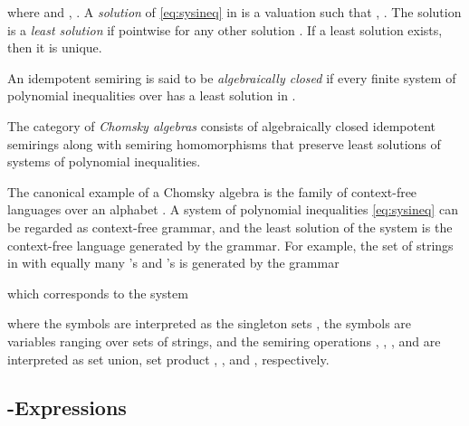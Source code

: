 \documentclass[copyright,creativecommons]{eptcs}
\theoremstyle{remark}
\newcommand{\fhcomment}[1]{\textcolor{red}{[\textbf{Comment (FH)}: {#1}]}}
\newcommand{\dkcomment}[1]{\textcolor{blue}{[\textbf{Comment (DK)}: {#1}]}}
\renewcommand{\fhcomment}[1]{}
\renewcommand{\dkcomment}[1]{}
\begin{document}
where  and , . A \emph{solution} of \eqref{eq:sysineq} in  is a valuation  such that , . The solution  is a \emph{least solution} if  pointwise for any other solution . If a least solution exists, then it is unique.

An idempotent semiring  is said to be \emph{algebraically closed} if every finite system of polynomial inequalities over  has a least solution in .

The category of \emph{Chomsky algebras} consists of algebraically closed idempotent semirings along with semiring homomorphisms that preserve least solutions of systems of polynomial inequalities.
\fhcomment{Add: Definition of what exactly this means.}\dkcomment{I didn't do this because it is more or less obvious what we mean, but clunky (and not too instructive) to write down formally, and we don't really use it anywhere. It would have been moot if we had started off with -expressions in our language, because homomorphisms would have to preserve . But I like our formulation better because it is closer in spirit to the definition of algebraically closed fields. The corresponding statement in fields is that automorphisms preserve roots of polynomials. Formally, a Chomsky algebra morphism is a semiring homomorphism  such that if  is the unique extension of  such that , and if  is the least solution to the system , , then  is the least solution to the system , .}\fhcomment{Okay.  A reader might be interested anyway, given 
it's mentioned to start with.  Going with both  and  as expressions in this paper could 
save space, I believe, and leave an proper algebraic treatment of  as
extension to  as something for later.  What do you think?}

The canonical example of a Chomsky algebra is the family of context-free languages  over an alphabet . A system of polynomial inequalities \eqref{eq:sysineq} can be regarded as context-free grammar, and the least solution of the system is the context-free language generated by the grammar. For example, the set of strings in  with equally many 's and 's is generated by the grammar

which corresponds to the system

where the symbols  are interpreted as the singleton sets , the symbols  are variables ranging over sets of strings, and the semiring operations , , , and  are interpreted as set union, set product , , and , respectively.
 
\subsection{-Expressions}
\label{sec:mu-exp}
\end{document}
